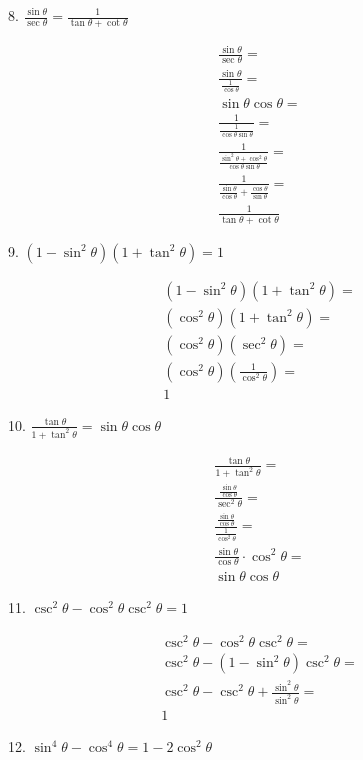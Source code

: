 \documentclass[]{report}
\begin{document}
8. $\frac{\sin \theta}{\sec \theta} = \frac{1}{\tan \theta + \cot \theta}$

\begin{align*}
\frac{\sin \theta}{\sec \theta} = \\
\frac{\sin \theta}{\frac{1}{\cos \theta}} = \\
\sin \theta \cos \theta = \\
\frac{1}{\frac{1}{\cos \theta \sin \theta}} = \\
\frac{1}{\frac{\sin^2 \theta + \cos ^2 \theta}{\cos \theta \sin \theta}} = \\
\frac{1}{\frac{\sin \theta}{\cos \theta} + \frac{\cos \theta}{\sin \theta}} = \\
\frac{1}{\tan \theta + \cot \theta}
\end{align*}

9. $(1 - \sin^2 \theta)(1+\tan^2\theta) = 1$

\begin{align*}
(1-\sin^2\theta)(1+\tan^2\theta) = \\
(\cos^2\theta)(1+\tan^2\theta) = \\
(\cos^2\theta)(\sec^2\theta) = \\
(\cos^2\theta)(\frac{1}{\cos^2\theta}) = \\
1
\end{align*}

10. $\frac{\tan \theta}{1 + \tan^2\theta} = \sin\theta\cos\theta$

\begin{align*}
\frac{\tan \theta}{1 + \tan^2\theta} = \\
\frac{\frac{\sin\theta}{\cos\theta}}{\sec^2\theta} = \\
\frac{\frac{\sin\theta}{\cos\theta}}{\frac{1}{\cos^2\theta}} = \\
\frac{\sin\theta}{\cos\theta} \cdot \cos^2\theta = \\
\sin \theta \cos \theta
\end{align*}

11. $\csc^2\theta - \cos^2 \theta\csc^2\theta = 1$

\begin{align*}
\csc^2\theta - \cos^2\theta\csc^2\theta = \\
\csc^2\theta - (1 - \sin^2\theta)\csc^2\theta = \\
\csc^2\theta - \csc^2\theta + \frac{\sin^2\theta}{\sin^2\theta} = \\
1
\end{align*}

12. $\sin^4\theta - \cos^4\theta = 1-2\cos^2\theta$
\end{document}
